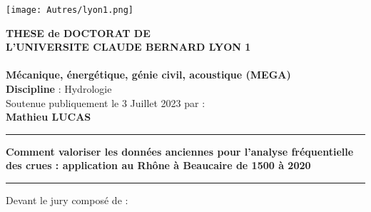 \thispagestyle{empty}


\vspace*{0.1cm}
\begin{center}
\texttt{[image: Autres/lyon1.png]}
\hfill
\end{center}

\begin{center}
\noindent \large \textbf{THESE de DOCTORAT DE} \\
\noindent \large \textbf{L'UNIVERSITE CLAUDE BERNARD LYON 1} \\
\\
\noindent \normalsize \textbf{Mécanique, énergétique, génie civil, acoustique (MEGA)}\\
\noindent \normalsize \textbf{Discipline} : Hydrologie\\
\noindent \normalsize {Soutenue publiquement le 3 Juillet 2023 par : \\}
\noindent \large \textbf{Mathieu LUCAS} \\
\hrule
{}
{\LARGE \textbf{Comment valoriser les données anciennes pour l'analyse fréquentielle des crues : application au Rhône à Beaucaire de 1500 à 2020}}
\hrule 
{}
\end{center}
\noindent \normalsize Devant le jury composé de :\\
